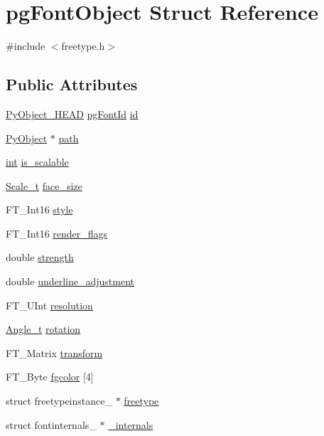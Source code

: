 \hypertarget{structpg_font_object}{}\section{pg\+Font\+Object Struct Reference}
\label{structpg_font_object}


{\ttfamily \#include $<$freetype.\+h$>$}

\subsection*{Public Attributes}
\begin{DoxyCompactItemize}
\item 
\mbox{\hyperlink{_python27_2object_8h_a0bf35c1f3ea13f925de94d8593db3b7e}{Py\+Object\+\_\+\+H\+E\+AD}} \mbox{\hyperlink{structpg_font_id}{pg\+Font\+Id}} \mbox{\hyperlink{structpg_font_object_a20540d70bdb4ed063ff927c38522741b}{id}}
\item 
\mbox{\hyperlink{_python27_2object_8h_aadc84ac7aed2cfa6f20c25f62bf3dac7}{Py\+Object}} $\ast$ \mbox{\hyperlink{structpg_font_object_a91662711b34054539569c74b4d46bdf6}{path}}
\item 
\mbox{\hyperlink{warnings_8h_a74f207b5aa4ba51c3a2ad59b219a423b}{int}} \mbox{\hyperlink{structpg_font_object_a1c2a4772a867ea084e8d25ffc1a6972b}{is\+\_\+scalable}}
\item 
\mbox{\hyperlink{freetype_8h_a7b7f11d7e1985559df17f8da75ea76b3}{Scale\+\_\+t}} \mbox{\hyperlink{structpg_font_object_ac60c5b915ec67e9a4cac9de614d0257e}{face\+\_\+size}}
\item 
F\+T\+\_\+\+Int16 \mbox{\hyperlink{structpg_font_object_ae5eed244546d80f452d96882cf022c91}{style}}
\item 
F\+T\+\_\+\+Int16 \mbox{\hyperlink{structpg_font_object_afa0356bb79b52e587177481a94662b90}{render\+\_\+flags}}
\item 
double \mbox{\hyperlink{structpg_font_object_ab63990a97aee56ed72ad714d04eef9cd}{strength}}
\item 
double \mbox{\hyperlink{structpg_font_object_a3d76b1e36c49d1bcc25d7f9bf03ef936}{underline\+\_\+adjustment}}
\item 
F\+T\+\_\+\+U\+Int \mbox{\hyperlink{structpg_font_object_a001531cf20c3cc2d19f5882f190a857a}{resolution}}
\item 
\mbox{\hyperlink{freetype_8h_af330e1256f38e235547df00ff7e08861}{Angle\+\_\+t}} \mbox{\hyperlink{structpg_font_object_ae243df88deae255775fc7bda7dd6d036}{rotation}}
\item 
F\+T\+\_\+\+Matrix \mbox{\hyperlink{structpg_font_object_a6ac91874c7492a81c2b4a7ef83cb8a26}{transform}}
\item 
F\+T\+\_\+\+Byte \mbox{\hyperlink{structpg_font_object_a5d4105c21e0da1199ee816568ce22ad3}{fgcolor}} \mbox{[}4\mbox{]}
\item 
struct freetypeinstance\+\_\+ $\ast$ \mbox{\hyperlink{structpg_font_object_a62634b59e91f97fc657ad10df92d92e3}{freetype}}
\item 
struct fontinternals\+\_\+ $\ast$ \mbox{\hyperlink{structpg_font_object_a19bbf351975bc8011958a6cb9f28e25c}{\+\_\+internals}}
\end{DoxyCompactItemize}


